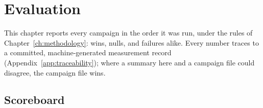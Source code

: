 \chapter{Evaluation}
\label{ch:evaluation}

This chapter reports every campaign in the order it was run, under the rules
of Chapter~\ref{ch:methodology}: wins, nulls, and failures alike. Every
number traces to a committed, machine-generated measurement record
(Appendix~\ref{app:traceability}); where a summary here and a campaign file
could disagree, the campaign file wins.

\section{Scoreboard}
\label{sec:eval-scoreboard}

